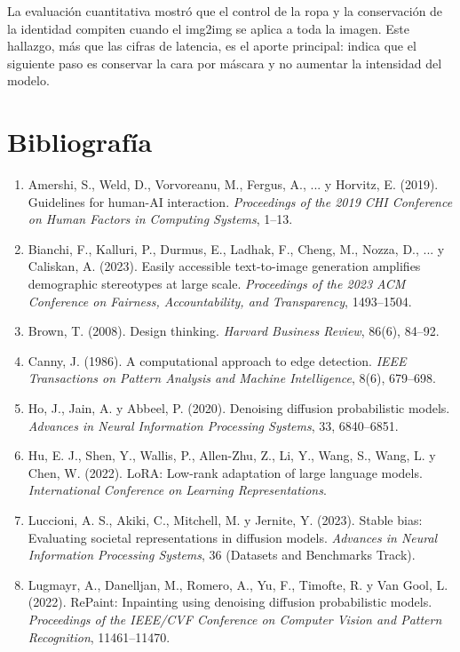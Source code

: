 \documentclass[conference]{IEEEtran}
\begin{document}
La evaluación cuantitativa mostró que el control de la ropa y la conservación de la identidad compiten cuando el img2img se aplica a toda la imagen. Este hallazgo, más que las cifras de latencia, es el aporte principal: indica que el siguiente paso es conservar la cara por máscara y no aumentar la intensidad del modelo.

\section*{Bibliografía}

\begin{enumerate}
\item Amershi, S., Weld, D., Vorvoreanu, M., Fergus, A., ... y Horvitz, E. (2019). Guidelines for human-AI interaction. \emph{Proceedings of the 2019 CHI Conference on Human Factors in Computing Systems}, 1–13.
\item Bianchi, F., Kalluri, P., Durmus, E., Ladhak, F., Cheng, M., Nozza, D., ... y Caliskan, A. (2023). Easily accessible text-to-image generation amplifies demographic stereotypes at large scale. \emph{Proceedings of the 2023 ACM Conference on Fairness, Accountability, and Transparency}, 1493–1504.
\item Brown, T. (2008). Design thinking. \emph{Harvard Business Review}, 86(6), 84–92.
\item Canny, J. (1986). A computational approach to edge detection. \emph{IEEE Transactions on Pattern Analysis and Machine Intelligence}, 8(6), 679–698.
\item Ho, J., Jain, A. y Abbeel, P. (2020). Denoising diffusion probabilistic models. \emph{Advances in Neural Information Processing Systems}, 33, 6840–6851.
\item Hu, E. J., Shen, Y., Wallis, P., Allen-Zhu, Z., Li, Y., Wang, S., Wang, L. y Chen, W. (2022). LoRA: Low-rank adaptation of large language models. \emph{International Conference on Learning Representations}.
\item Luccioni, A. S., Akiki, C., Mitchell, M. y Jernite, Y. (2023). Stable bias: Evaluating societal representations in diffusion models. \emph{Advances in Neural Information Processing Systems}, 36 (Datasets and Benchmarks Track).
\item Lugmayr, A., Danelljan, M., Romero, A., Yu, F., Timofte, R. y Van Gool, L. (2022). RePaint: Inpainting using denoising diffusion probabilistic models. \emph{Proceedings of the IEEE/CVF Conference on Computer Vision and Pattern Recognition}, 11461–11470.

\end{enumerate}
\end{document}
